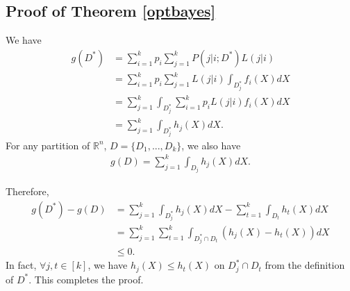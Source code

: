 \documentclass[english]{article}
\newenvironment{eqt}{\begin{equation}\begin{aligned}}{\end{aligned}\end{equation}}
\begin{document}



\begin{appendix}
\section{Proof of Theorem \ref{optbayes}}
\par

We have
\begin{eqt}
g(D^*) & = \sum_{i=1}^kp_i\sum_{j=1}^kP(j|i;D^*)L(j|i) \\
& = \sum_{i=1}^kp_i\sum_{j=1}^kL(j|i)\int_{D_j^*}f_i(X)dX \\
& = \sum_{j=1}^k\int_{D_j^*}\sum_{i=1}^kp_iL(j|i)f_i(X)dX \\
& = \sum_{j=1}^k\int_{D_j^*}h_j(X)dX.
\end{eqt}
For any partition of $\mathbb{R}^n$, $D = \{D_1, ..., D_k\}$, we also have
\begin{eqt}
g(D) = \sum_{j=1}^k\int_{D_j}h_j(X)dX.
\end{eqt}

Therefore, 
\begin{eqt}
g(D^*) - g(D) & = \sum_{j=1}^k\int_{D_j^*}h_j(X)dX - \sum_{t=1}^k\int_{D_t}h_t(X)dX \\
& = \sum_{j=1}^k\sum_{t=1}^k\int_{D_j^*\cap D_t}\left(h_j(X)-h_t(X)\right)dX \\
& \leqslant 0.
\end{eqt}
In fact, $\forall j, t\in[k]$, we have $h_j(X)\leqslant h_t(X)$ on $D_j^*\cap D_t$ from the definition of $D^*$. This completes the proof.
\end{appendix}
\end{document}
